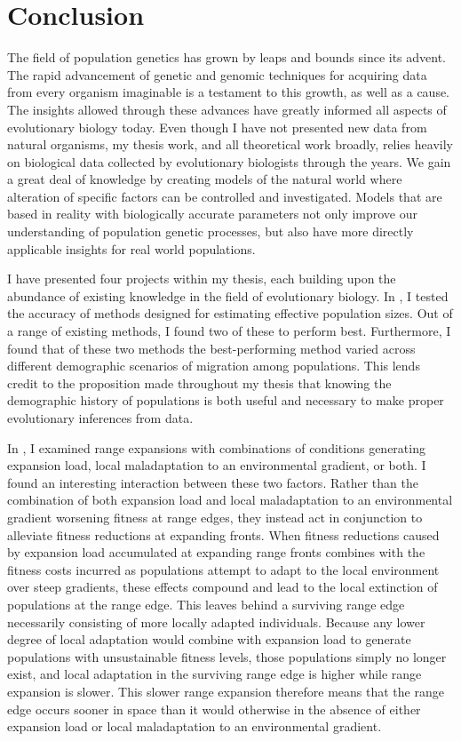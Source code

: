 \chapter{Conclusion}
\label{chap:conclusions}

The field of population genetics has grown by leaps and bounds since its advent. The rapid advancement of genetic and genomic techniques for acquiring data from every organism imaginable is a testament to this growth, as well as a cause. The insights allowed through these advances have greatly informed all aspects of evolutionary biology today. Even though I have not presented new data from natural organisms, my thesis work, and all theoretical work broadly, relies heavily on biological data collected by evolutionary biologists through the years. We gain a great deal of knowledge by creating models of the natural world where alteration of specific factors can be controlled and investigated. Models that are based in reality with biologically accurate parameters not only improve our understanding of population genetic processes, but also have more directly applicable insights for real world populations.

I have presented four projects within my thesis, each building upon the abundance of existing knowledge in the field of evolutionary biology. In , I tested the accuracy of methods designed for estimating effective population sizes. Out of a range of existing methods, I found two of these to perform best. Furthermore, I found that of these two methods the best-performing method varied across different demographic scenarios of migration among populations. This lends credit to the proposition made throughout my thesis that knowing the demographic history of populations is both useful and necessary to make proper evolutionary inferences from data.

In , I examined range expansions with combinations of conditions generating expansion load, local maladaptation to an environmental gradient, or both. I found an interesting interaction between these two factors. Rather than the combination of both expansion load and local maladaptation to an environmental gradient worsening fitness at range edges, they instead act in conjunction to alleviate fitness reductions at expanding fronts. When fitness reductions caused by expansion load accumulated at expanding range fronts combines with the fitness costs incurred as populations attempt to adapt to the local environment over steep gradients, these effects compound and lead to the local extinction of populations at the range edge. This leaves behind a surviving range edge necessarily consisting of more locally adapted individuals. Because any lower degree of local adaptation would combine with expansion load to generate populations with unsustainable fitness levels, those populations simply no longer exist, and local adaptation in the surviving range edge is higher while range expansion is slower. This slower range expansion therefore means that the range edge occurs sooner in space than it would otherwise in the absence of either expansion load or local maladaptation to an environmental gradient.

